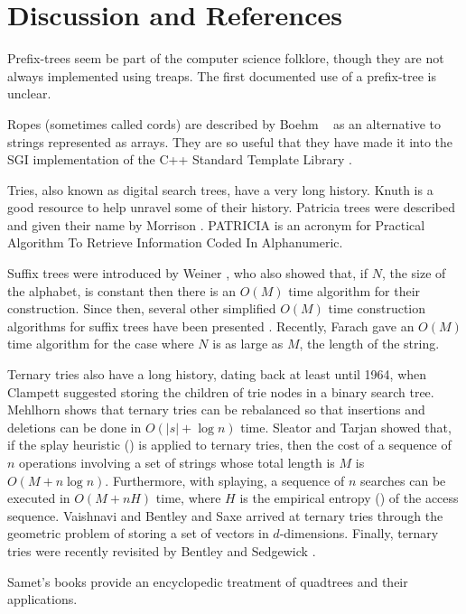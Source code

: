 \section{Discussion and References}

Prefix-trees seem be part of the computer science folklore, though
they are not always implemented using treaps. The first documented use
of a prefix-tree is unclear.

Ropes (sometimes called cords) are described by Boehm \etal\ \cite{bap95}
as an alternative to strings represented as arrays.  They are so useful
that they have made it into the SGI implementation of the C++ Standard
Template Library \cite{x}.

Tries, also known as digital search trees, have a very long history.
Knuth \cite{k73c} is a good resource to help unravel some of their
history.  Patricia trees were described and given their name by
Morrison \cite{m68}.  PATRICIA is an acronym for Practical Algorithm
To Retrieve Information Coded In Alphanumeric.

Suffix trees were introduced by Weiner \cite{w73}, who also showed
that, if $N$, the size of the alphabet, is constant then there is an
$O(M)$ time algorithm for their construction.  Since then, several
other simplified $O(M)$ time construction algorithms for suffix trees
have been presented \cite{cs85,m76}.  Recently, Farach \cite{f97} gave
an $O(M)$ time algorithm for the case where $N$ is as large as $M$,
the length of the string.

Ternary tries also have a long history, dating back at least until
1964, when Clampett \cite{c64} suggested storing the children of trie
nodes in a binary search tree.  Mehlhorn \cite{m79} shows that ternary
tries can be rebalanced so that insertions and deletions can be done
in $O(|s|+\log n)$ time.  Sleator and Tarjan \cite{st85} showed that,
if the splay heuristic () is applied to ternary
tries, then the cost of a sequence of $n$ operations involving a set
of strings whose total length is $M$ is $O(M+n\log n)$.  Furthermore,
with splaying, a sequence of $n$ searches can be executed in $O(M+
nH)$ time, where $H$ is the empirical entropy () of
the access sequence.  Vaishnavi \cite{v84} and Bentley and Saxe
\cite{bs79} arrived at ternary tries through the geometric problem of
storing a set of vectors in $d$-dimensions.  Finally, ternary tries
were recently revisited by Bentley and Sedgewick \cite{bs97}.

Samet's books \cite{s90,sXX,sYY} provide an encyclopedic treatment of
quadtrees and their applications.



